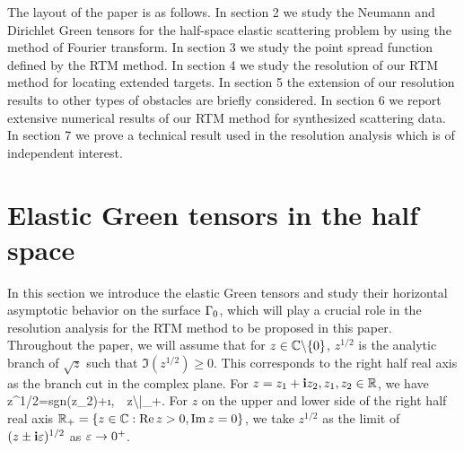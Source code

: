 \documentclass[12pt]{iopart}
\begin{document}
The layout of the paper is as follows. In section 2 we study the Neumann and Dirichlet Green tensors for the half-space elastic scattering problem by using the method of Fourier transform. In section 3 we study the point spread function defined by the RTM method. In section 4 we study the resolution of our RTM method for locating extended targets. In section 5 the extension of our resolution results to other types of obstacles are briefly considered. In section 6 we report extensive numerical results of our RTM method
for synthesized scattering data. In section 7 we prove a technical result used in the resolution analysis which is of independent interest.

\section{Elastic Green tensors in the half space}

In this section we introduce the elastic Green tensors and study their horizontal asymptotic behavior on the surface $\Gamma_0$, which will play a crucial role in the resolution analysis for the RTM method to be proposed in this paper. Throughout the paper, we will assume that for $z\in\mathbb{C}\backslash\{0\}$, $z^{1/2}$ is the analytic branch of $\sqrt{z}$ such that $\Im (z^{1/2})\geq0$. This corresponds to the right half real axis as the branch cut in the complex plane. For $z=z_1+\mathbf{i} z_2,z_1,z_2\in\mathbb{R}$, we have
\be \label{convention_1}
z^{1/2}={\rm sgn}(z_2)+\i{},\ \ \forall z\in\C\backslash\bar{\R}_+.
\ee
For $z$ on the upper and lower side of the right half real axis $\mathbb{R}_+=\{z\in{\mathbb{C}}:\mathrm{Re}\, z>0,\mathrm{Im}\, z=0\}$, we take $z^{1/2}$ as the limit of $(z\pm\mathbf{i}\varepsilon)^{1/2}$ as $\varepsilon \to 0^+$.
\end{document}
